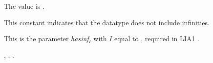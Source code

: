 \documentclass[../Integers.tex]{subfiles}
\begin{document}

\DValues{}

The value is .

\DDescription{}

This constant indicates that the \CL{} datatype  does not
include infinities.

\DNotes{}

This is the parameter \textit{hasinf}$_I$ with $I$ equal to
, required in LIA1 \cite{2012:LIA1}.

\DSeeAlso{}

, , .
\end{document}
